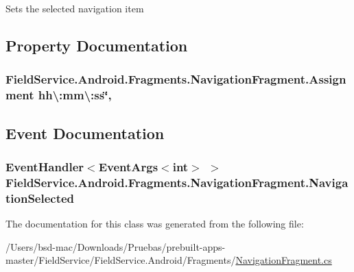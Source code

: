 Sets the selected navigation item 



\subsection{Property Documentation}
\hypertarget{class_field_service_1_1_android_1_1_fragments_1_1_navigation_fragment_a00cacdc6737df9d38076a490c783ad4c}{
\subsubsection[{Assignment}]{ Field\+Service.\+Android.\+Fragments.\+Navigation\+Fragment.\+Assignment hh\textbackslash{}\+:mm\textbackslash{}\+:ss\char`\"{}\hspace{0.3cm}{\ttfamily [get]}, {\ttfamily [set]}}}\label{class_field_service_1_1_android_1_1_fragments_1_1_navigation_fragment_a00cacdc6737df9d38076a490c783ad4c}


\subsection{Event Documentation}
\hypertarget{class_field_service_1_1_android_1_1_fragments_1_1_navigation_fragment_aa2bfa9504918a62832e7f7c9a13f1c62}{
\subsubsection[{Navigation\+Selected}]{\setlength{\rightskip}{0pt plus 5cm}Event\+Handler$<$Event\+Args$<$int$>$ $>$ Field\+Service.\+Android.\+Fragments.\+Navigation\+Fragment.\+Navigation\+Selected}}\label{class_field_service_1_1_android_1_1_fragments_1_1_navigation_fragment_aa2bfa9504918a62832e7f7c9a13f1c62}


The documentation for this class was generated from the following file\+:\begin{DoxyCompactItemize}
\item 
/\+Users/bsd-\/mac/\+Downloads/\+Pruebas/prebuilt-\/apps-\/master/\+Field\+Service/\+Field\+Service.\+Android/\+Fragments/\hyperlink{_navigation_fragment_8cs}{Navigation\+Fragment.\+cs}\end{DoxyCompactItemize}
